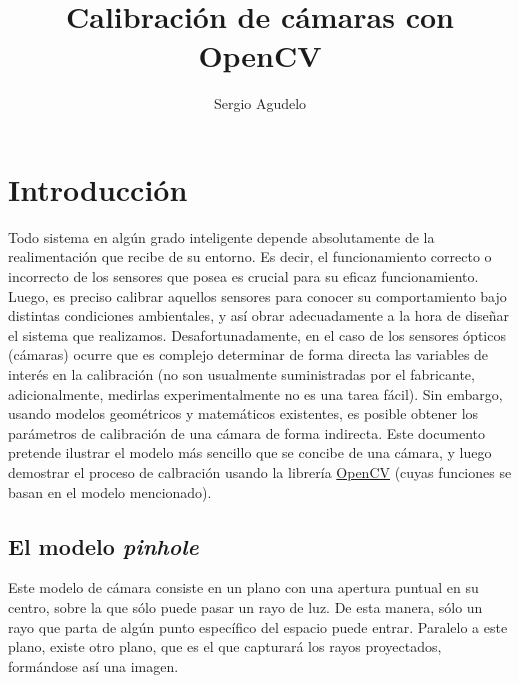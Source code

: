 \documentclass[12pt]{article}
\date{}
\title{Calibración de cámaras con OpenCV}
\author{Sergio Agudelo}
\begin{document}
    
    
    \maketitle
    
    

    
    \section{Introducción}\label{introducciuxf3n}

    Todo sistema en algún grado inteligente depende absolutamente de la
realimentación que recibe de su entorno. Es decir, el funcionamiento
correcto o incorrecto de los sensores que posea es crucial para su
eficaz funcionamiento. Luego, es preciso calibrar aquellos sensores para
conocer su comportamiento bajo distintas condiciones ambientales, y así
obrar adecuadamente a la hora de diseñar el sistema que realizamos.
Desafortunadamente, en el caso de los sensores ópticos (cámaras) ocurre
que es complejo determinar de forma directa las variables de interés en
la calibración (no son usualmente suministradas por el fabricante,
adicionalmente, medirlas experimentalmente no es una tarea fácil). Sin
embargo, usando modelos geométricos y matemáticos existentes, es posible
obtener los parámetros de calibración de una cámara de forma indirecta.
Este documento pretende ilustrar el modelo más sencillo que se concibe
de una cámara, y luego demostrar el proceso de calbración usando la
librería \href{http://opencv.org}{OpenCV} (cuyas funciones se basan en
el modelo mencionado).

    \subsection{\texorpdfstring{El modelo \emph{pinhole}
\cite{bradski2008learning}}{El modelo pinhole }}\label{el-modelo-pinhole}

    Este modelo de cámara consiste en un plano con una apertura puntual en
su centro, sobre la que sólo puede pasar un rayo de luz. De esta manera,
sólo un rayo que parta de algún punto específico del espacio puede
entrar. Paralelo a este plano, existe otro plano, que es el que
capturará los rayos proyectados, formándose así una imagen.
\end{document}
